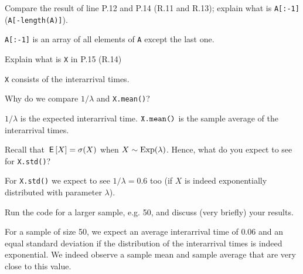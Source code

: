 \begin{exercise}
Compare the result of  line P.12 and P.14 (R.11 and R.13);  explain what is \texttt{A[:-1]} (\texttt{A[-length(A)]}).
\begin{solution}
\verb|A[:-1]| is an array of all elements of \verb|A| except the last one.
\end{solution}
\end{exercise}

\begin{exercise}
 Explain what is \texttt{X} in P.15 (R.14)
\begin{solution}
\verb|X| consists of the interarrival times.
\end{solution}
\end{exercise}

\begin{exercise}
Why do we compare $1/\lambda$ and \texttt{X.mean()}?
\begin{solution}
$1/\lambda$ is the expected interarrival time. $\verb|X.mean()|$ is the sample average of the interarrival times.
\end{solution}
\end{exercise}

\begin{exercise}
Recall that $\,\mathsf{E}\left[X\right] = \sigma (X)$ when $X\sim \mathrm{Exp}(\lambda)$.
Hence, what do you expect to see for \texttt{X.std()}?
\begin{solution}
For \verb|X.std()| we expect to see $1/\lambda = 0.6$ too (if $X$ is indeed exponentially distributed with parameter $\lambda$).
\end{solution}
\end{exercise}

\begin{exercise}
 Run the code for a larger sample, e.g. 50, and discuss (very briefly) your results.
\begin{solution}
For a sample of size 50, we expect an average interarrival time of $0.06$ and an equal standard deviation if the distribution of the interarrival times is indeed exponential. We indeed observe a sample mean and sample average that are very close to this value.
\end{solution}
\end{exercise}


